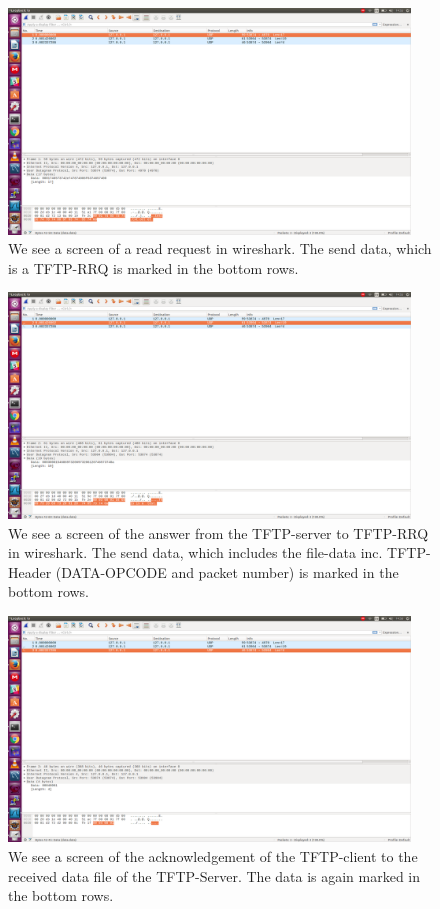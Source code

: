 \documentclass[a4paper,12pt]{article}
\numberwithin{figure}{section}
\begin{document}
\begin{figure}[h!]
	\centering
	\includegraphics[width=0.95\textwidth,keepaspectratio]{img/Line1Wireshark.png} 
	\caption{We see a screen of a read request in wireshark. The send data, which is a TFTP-RRQ is marked in the bottom rows.}
	\label{ws1}
\end{figure}

\begin{figure}[h!]
	\centering
	\includegraphics[width=0.95\textwidth,keepaspectratio]{img/Line2Wireshark.png} 
	\caption{We see a screen of the answer from the TFTP-server to TFTP-RRQ in wireshark. The send data, which includes the file-data inc. TFTP-Header (DATA-OPCODE and packet number) is marked in the bottom rows.}
	\label{ws2}
\end{figure}

\begin{figure}[h!]
	\centering
	\includegraphics[width=0.95\textwidth,keepaspectratio]{img/Line3Wireshark.png} 
	\caption{We see a screen of the acknowledgement of the TFTP-client to the received data file of the TFTP-Server. The data is again marked in the bottom rows.}
	\label{ws3}
\end{figure}
\end{document}

